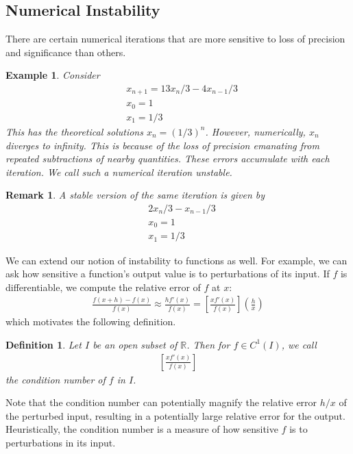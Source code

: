 \documentclass[12pt,reqno]{amsart}
\numberwithin{equation}{section}  %
\newcommand{\rr}{\mathbb{R}}
\newtheorem*{definition}{Definition}
\newtheorem*{remark}{Remark}
\newtheorem*{example}{Example}
\begin{document}
\subsection{Numerical Instability}
There are certain numerical iterations that are more sensitive
to loss of precision and significance than others.
\begin{example}
Consider
\begin{align*}
& x_{n+1} = 13x_n/3 - 4x_{n-1}/3
\\
& x_0 = 1
\\
& x_1 = 1/3
\end{align*}
This has the theoretical solutions $x_n = (1/3)^n$. However, numerically,
$x_n$ diverges to infinity. This is because of the loss of precision
emanating from repeated subtractions of nearby quantities. These
errors accumulate with each iteration. We call such a numerical iteration
\emph{unstable}.
\end{example}
\begin{remark}
A stable version of the same iteration is given by
\begin{align*}
& 2 x_n /3 - x_{n-1}/3
\\
& x_0 = 1
\\
& x_1 = 1/3
\end{align*}
\end{remark}
We can extend our notion of instability to functions as well.
For example, we can ask how sensitive a function's output value is
to perturbations of its input. If $f$ is differentiable, we compute
the relative error of $f$ at $x$:
\begin{align*}
\frac{f(x + h) - f(x)}{f(x)} \approx \frac{h f'(x)}{f(x)} = 
\left[ \frac{x f'(x)}{f(x)}\right]\left( \frac{h}{x}\right)
\end{align*}
which motivates the following definition.
\begin{definition}
Let $I$ be an open subset of $\rr$. Then for $f \in C^1(I)$, 
we call 
\begin{align*}
\left[ \frac{x f'(x)}{f(x)}\right]
\end{align*}
the \emph{condition number} of $f$ in $I$.
\end{definition}
Note that the condition number can potentially magnify
the relative error $h/x$ of the perturbed input, resulting
in a potentially large relative error for the output. Heuristically,
the condition number is a measure of how sensitive $f$ is to perturbations
in its input.
\end{document}
